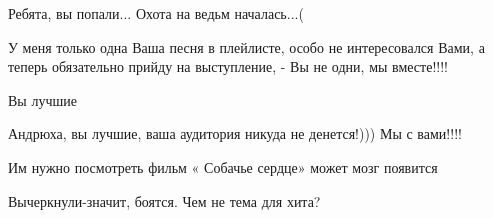 \begin{itemize}
 
Ребята, вы попали... Охота на ведьм началась...(

 
У меня только одна Ваша песня в плейлисте, особо не интересовался Вами, а теперь обязательно прийду на выступление, - Вы не одни, мы вместе!!!!

 
Вы лучшие 💪

 
Андрюха, вы лучшие, ваша аудитория никуда не денется!)))
Мы с вами!!!!

 
Им нужно посмотреть фильм « Собачье сердце» может мозг появится

 
Вычеркнули-значит, боятся. Чем не тема для хита?

 

\end{itemize}

